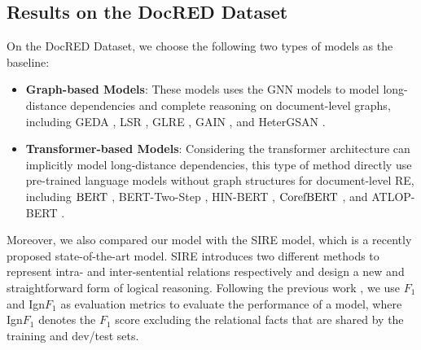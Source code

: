 \documentclass[sigconf,natbib=true]{acmart}
\begin{document}
\subsection{Results on the DocRED Dataset}
On the DocRED Dataset, we choose the following two types of models as the baseline:
\begin{itemize}
    \item \textbf{Graph-based Models}: 
    These models uses the GNN models \cite{c:153,c:117,c:154}  to model long-distance dependencies and complete reasoning on document-level graphs, including GEDA \cite{c:129}, LSR \cite{c:130}, GLRE \cite{c:131}, GAIN \cite{c:118}, and HeterGSAN \cite{c:133}.
    
    \item \textbf{Transformer-based Models}: 
    Considering the transformer architecture can implicitly model long-distance dependencies, this type of method directly use pre-trained language models without graph structures for document-level RE, including $\rm BERT$ \cite{c:133}, BERT-Two-Step \cite{c:134}, HIN-BERT \cite{c:111}, $\rm CorefBERT$ \cite{c:145}, and ATLOP-BERT \cite{c:106}.
\end{itemize}
Moreover, we also compared our model with the SIRE \cite{c:121} model, which is a recently proposed state-of-the-art model. 
SIRE introduces two different methods to represent intra- and inter-sentential relations respectively and design a new and straightforward form of logical reasoning.
Following the previous work \cite{c:105}, we use $F_1$ and Ign$F_1$ as evaluation metrics to evaluate the performance of a model, where Ign$F_1$ denotes the $F_1$ score excluding the relational facts that are shared by the training and dev/test sets. 

\begin{table}[t]
\centering
{}
\caption{\label{tab7} Hyper-parameter Settings.}
\end{table}
\end{document}
